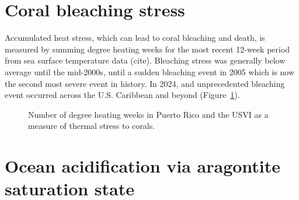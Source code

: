 \documentclass[
  letterpaper,
  oneside,
  open=any]{scrbook}
\begin{document}
\section{Coral bleaching stress}\label{coral-bleaching-stress}

Accumulated heat stress, which can lead to coral bleaching and death, is
measured by summing degree heating weeks for the most recent 12-week
period from sea surface temperature data (cite). Bleaching stress was
generally below average until the mid-2000s, until a sudden bleaching
event in 2005 which is now the second most severe event in history. In
2024, and unprecedented bleaching event occurred across the U.S.
Caribbean and beyond (Figure~\ref{fig-DHW}).

\begin{figure}


\caption{\label{fig-DHW}Number of degree heating weeks in Puerto Rico
and the USVI as a measure of thermal stress to corals.}

\end{figure}%

\section{Ocean acidification via aragontite saturation
state}\label{ocean-acidification-via-aragontite-saturation-state}
\end{document}
